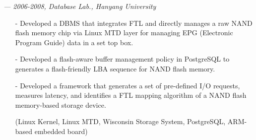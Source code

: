     {\it \footnotesize --- 2006-2008, Database Lab., Hanyang University}
    \begin{itemize}[leftmargin=*]
    \setlength\itemsep{-0.02in}
    \item[-] Developed a DBMS that integrates FTL and directly manages a raw NAND flash
             memory chip via Linux MTD layer for managing EPG (Electronic Program Guide)
             data in a set top box.
    \item[-] Developed a flash-aware buffer management policy in PostgreSQL
             to generates a flash-friendly LBA sequence for NAND flash memory.
    \item[-] Developed a framework that generates a set of pre-defined I/O
             requests, measures latency,
	     and identifies a FTL mapping algorithm
             of a NAND flash memory-based
             storage device.
    \item[] {\small(Linux Kernel, Linux MTD, Wisconsin Storage System, PostgreSQL,
             ARM-based embedded board)}
    \end{itemize}

